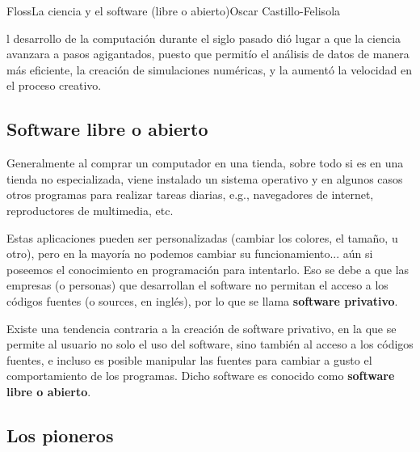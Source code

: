 
\begin{article}[2]{Floss}{La ciencia y el software (libre o abierto)}{Oscar Castillo-Felisola}
  
l desarrollo de la computaci\'on durante el siglo pasado di\'o lugar a que la ciencia avanzara a pasos agigantados, puesto que permit\'io el an\'alisis de datos de manera m\'as eficiente, la creaci\'on de simulaciones num\'ericas, y la aument\'o la velocidad en el proceso creativo.



\subsection{Software libre o abierto}

Generalmente al comprar un computador en una tienda, sobre todo si es en una tienda no especializada, viene instalado un sistema operativo y en algunos casos otros programas para realizar tareas diarias, e.g., navegadores de internet, reproductores de multimedia, etc. 

Estas aplicaciones pueden ser personalizadas (cambiar los colores, el tama\~no, u otro), pero en la mayor\'ia no podemos cambiar su funcionamiento... a\'un si poseemos el conocimiento en programaci\'on para intentarlo. Eso se debe a que las empresas (o personas) que desarrollan el software no permitan el acceso a los c\'odigos fuentes (o sources, en ingl\'es), por lo que se llama {\bf software privativo}.

Existe una tendencia contraria a la creaci\'on de software privativo, en la que se permite al usuario no solo el uso del software, sino tambi\'en al acceso a los c\'odigos fuentes, e incluso es posible manipular las fuentes para cambiar a gusto el comportamiento de los programas. Dicho software es conocido como {\bf software libre o abierto}.

\subsection{Los pioneros}


\end{article}
